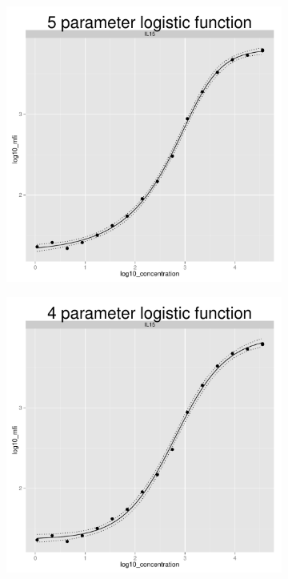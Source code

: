\documentclass[11pt]{article}\usepackage[]{graphicx}\usepackage[]{color}
\makeatletter
\def\maxwidth{ %
  \ifdim\Gin@nat@width>\linewidth
    \linewidth
  \else
    \Gin@nat@width
  \fi
}
\newenvironment{knitrout}{}{} %
\makeatother
\begin{document}
\begin{figure}[!ht]
\begin{center}
    \begin{subfigure}{.28\textwidth}
\begin{knitrout}
\color{fgcolor}
\includegraphics[width=\maxwidth]{./unnamed-chunk-15-1} 

\end{knitrout}
    \end{subfigure}
    \begin{subfigure}{.28\textwidth}
\begin{knitrout}
\color{fgcolor}
\includegraphics[width=\maxwidth]{./unnamed-chunk-16-1} 


\end{knitrout}
\end{subfigure}
\end{center}
\end{figure}
\end{document}
